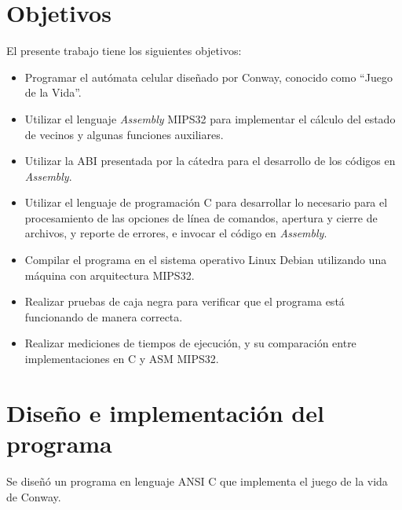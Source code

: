 \documentclass[a4paper,12pt]{article}
\newcommand{\quotes}[1]{``#1''}
\numberwithin{equation}{section}
\numberwithin{figure}{section}
\begin{document}
\section{Objetivos}
El presente trabajo tiene los siguientes objetivos:
\begin{itemize}
    \item Programar el autómata celular diseñado por Conway, conocido como \quotes{Juego de la Vida}.
    \item Utilizar el lenguaje \textit{Assembly} MIPS32 para implementar el cálculo del estado de vecinos y algunas funciones auxiliares.
    \item Utilizar la ABI presentada por la cátedra para el desarrollo de los códigos en \textit{Assembly}.
    \item Utilizar el lenguaje de programación C para desarrollar lo necesario para el procesamiento de las opciones de línea de comandos, apertura y cierre de archivos, y reporte de errores, e invocar el código en \textit{Assembly}.
    \item Compilar el programa en el sistema operativo Linux Debian utilizando una máquina con arquitectura MIPS32.
    \item Realizar pruebas de caja negra para verificar que el programa está funcionando de manera correcta.
    \item Realizar mediciones de tiempos de ejecución, y su comparación entre implementaciones en C y ASM MIPS32.
\end{itemize}

\section{Diseño e implementación del programa}

Se diseñó un programa en lenguaje ANSI C que implementa el juego de la vida de Conway.
\end{document}
